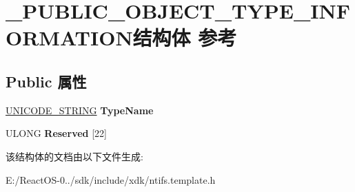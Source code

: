 \hypertarget{struct___p_u_b_l_i_c___o_b_j_e_c_t___t_y_p_e___i_n_f_o_r_m_a_t_i_o_n}{}\section{\+\_\+\+P\+U\+B\+L\+I\+C\+\_\+\+O\+B\+J\+E\+C\+T\+\_\+\+T\+Y\+P\+E\+\_\+\+I\+N\+F\+O\+R\+M\+A\+T\+I\+O\+N结构体 参考}
\label{struct___p_u_b_l_i_c___o_b_j_e_c_t___t_y_p_e___i_n_f_o_r_m_a_t_i_o_n}
\subsection*{Public 属性}
\begin{DoxyCompactItemize}
\item 
\mbox{\label{struct___p_u_b_l_i_c___o_b_j_e_c_t___t_y_p_e___i_n_f_o_r_m_a_t_i_o_n_ab34fe863927628e51d17637992c86d99}} 
\hyperlink{struct___u_n_i_c_o_d_e___s_t_r_i_n_g}{U\+N\+I\+C\+O\+D\+E\+\_\+\+S\+T\+R\+I\+NG} {\bfseries Type\+Name}
\item 
\mbox{\label{struct___p_u_b_l_i_c___o_b_j_e_c_t___t_y_p_e___i_n_f_o_r_m_a_t_i_o_n_a52f013ef3456f59bd454730a7a5b1b8a}} 
U\+L\+O\+NG {\bfseries Reserved} \mbox{[}22\mbox{]}
\end{DoxyCompactItemize}


该结构体的文档由以下文件生成\+:\begin{DoxyCompactItemize}
\item 
E\+:/\+React\+O\+S-\/0../sdk/include/xdk/ntifs.\+template.\+h\end{DoxyCompactItemize}
